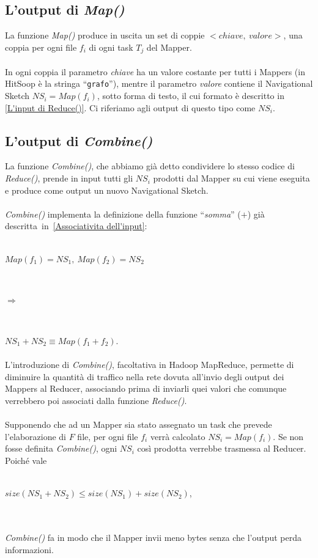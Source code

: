 \documentclass[a4paper,11pt]{report}
\begin{document}
\subsection{L'output di \emph{Map()}}
La funzione \emph{Map()}  produce in uscita un set di coppie $<chiave,\ valore>$, una coppia per ogni file $f_i$ di ogni task $T_j$ del
Mapper. 
\paragraph{}
In ogni coppia il parametro \emph{chiave} ha un valore costante per tutti i Mappers (in HitSoop è la stringa ``\verb|grafo|''),  mentre il
parametro \emph{valore} contiene il Navigational 
Sketch $NS_i=Map\left(f_i\right)$, sotto forma di testo, il cui formato è descritto in \ref{L'input di Reduce()}.
Ci riferiamo agli output di questo tipo come $NS_i$.
\subsection{L'output di \emph{Combine()}}
La funzione \emph{Combine()}, che abbiamo già detto condividere lo stesso codice di \emph{Reduce()}, prende in input tutti gli $NS_i$
prodotti dal Mapper su cui viene eseguita e produce
come output un nuovo Navigational Sketch.
\paragraph{}
\emph{Combine()} implementa la definizione della funzione ``\emph{somma}'' ($+$) già \mbox{descritta in \ref{Associativita dell'input}}:\\\\
\centerline{$Map\left(f_1\right)=NS_1,\ Map\left(f_2\right)=NS_2$}\\
\centerline {$\Longrightarrow $}\\
\centerline{$NS_1+NS_2\equiv Map\left(f_1+f_2\right)$.}
\paragraph{}
L'introduzione di \emph{Combine()}, facoltativa in Hadoop MapReduce, permette di diminuire la quantità di traffico nella rete dovuta
all'invio degli output dei Mappers al Reducer, associando prima di 
inviarli quei valori che comunque verrebbero poi associati dalla funzione \emph{Reduce()}.
\paragraph{} 
Supponendo che ad un Mapper sia stato assegnato un task che prevede l'elaborazione di $F$ file, per ogni file $f_i$ verrà calcolato
$NS_i=Map\left(f_i\right)$. Se non fosse definita \emph{Combine()},
ogni $NS_i$ così prodotta verrebbe trasmessa al Reducer. Poiché vale \\\\
\centerline{$size\left(NS_1+NS_2\right)\leq size\left(NS_1\right)+size\left(NS_2\right)$,}\\\\
\emph{Combine()} fa in modo che il Mapper invii meno bytes senza che l'output perda informazioni.
\end{document}
